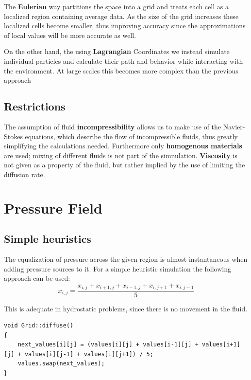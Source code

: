 \documentclass[12pt, titlepage]{article}
\begin{document}
\bigskip

The \textbf{Eulerian} way partitions the space into a grid and treats each cell as a localized region containing average data. As the size of the grid increases these localized cells become smaller, thus improving accuracy since the approximations of local values will be more accurate as well.

\bigskip

On the other hand, the using \textbf{Lagrangian} Coordinates we instead simulate individual particles and calculate their path and behavior while interacting with the environment.
At large scales this becomes more complex than the previous approach

\subsection{Restrictions}
The assumption of fluid \textbf{incompressibility} allows us to make use of the Navier-Stokes equations, which describe the flow of incompressible fluids, thus greatly simplífying the calculations needed.
Furthermore only \textbf{homogenous materials} are used; mixing of different fluids is not part of the simnulation.
\textbf{Viscosity} is not given as a property of the fluid, but rather implied by the use of limiting the diffusion rate.


\section{Pressure Field}

\subsection{Simple heuristics}

The equalization of pressure across the given region is almost instantaneous when adding pressure sources to it. For a simple heuristic simulation the following approach can be used:
\[ 
x_{i, j} = \frac{x_{i, j} + x_{i+1, j} + x_{i-1, j} + x_{i, j+1} + x_{i, j-1}}{5}
\]

This is adequate in hydrostatic problems, since there is no movement in the fluid.

\begin{lstlisting}
void Grid::diffuse()
{
	next_values[i][j] = (values[i][j] + values[i-1][j] + values[i+1][j] + values[i][j-1] + values[i][j+1]) / 5;
	values.swap(next_values);
}
\end{lstlisting}
\end{document}
